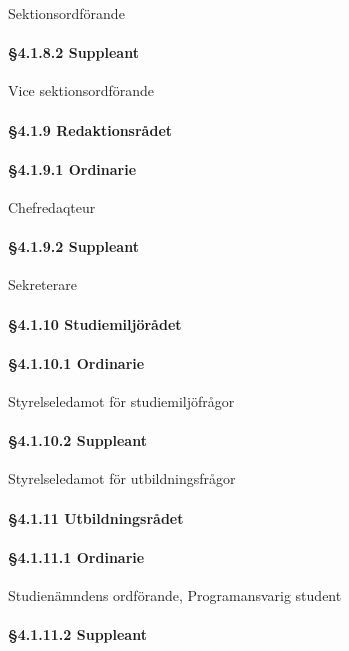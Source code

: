 Sektionsordförande

\paragraph{§4.1.8.2 Suppleant}

Vice sektionsordförande

\paragraph{§4.1.9 Redaktionsrådet}

\paragraph{§4.1.9.1 Ordinarie}

Chefredaqteur

\paragraph{§4.1.9.2 Suppleant}

Sekreterare

\paragraph{§4.1.10 Studiemiljörådet}

\paragraph{§4.1.10.1 Ordinarie}

Styrelseledamot för studiemiljöfrågor

\paragraph{§4.1.10.2 Suppleant}

Styrelseledamot för utbildningsfrågor

\paragraph{§4.1.11 Utbildningsrådet}

\paragraph{§4.1.11.1 Ordinarie}

Studienämndens ordförande, Programansvarig student

\paragraph{§4.1.11.2 Suppleant}


